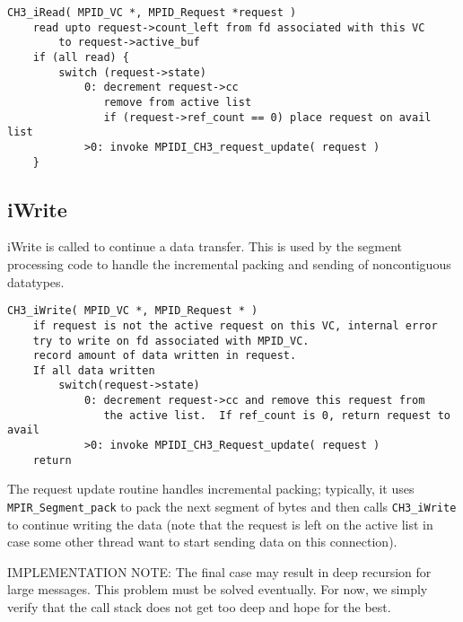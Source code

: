\documentclass{article}
\def\code{\begingroup\makeustext\eatcode}
\def\eatcode#1{\texttt{#1}\endgroup}
\begin{document}
\begin{verbatim}
CH3_iRead( MPID_VC *, MPID_Request *request )
    read upto request->count_left from fd associated with this VC
        to request->active_buf
    if (all read) {
        switch (request->state) 
            0: decrement request->cc
               remove from active list
               if (request->ref_count == 0) place request on avail list
            >0: invoke MPIDI_CH3_request_update( request )
    }
\end{verbatim}

\subsection{iWrite}
iWrite is called to continue a data transfer.  This is used by the
segment processing code to handle the incremental packing and sending
of noncontiguous datatypes.

\begin{verbatim}
CH3_iWrite( MPID_VC *, MPID_Request * )
    if request is not the active request on this VC, internal error
    try to write on fd associated with MPID_VC.  
    record amount of data written in request.
    If all data written
        switch(request->state)
            0: decrement request->cc and remove this request from
               the active list.  If ref_count is 0, return request to avail
            >0: invoke MPIDI_CH3_Request_update( request )
    return
\end{verbatim}
The request update routine handles incremental packing; typically, it
uses \code{MPIR_Segment_pack} to pack the next segment of bytes and
then calls \code{CH3_iWrite} to continue writing the data (note that
the request is left on the active list in case some other thread want
to start sending data on this connection).

IMPLEMENTATION NOTE: The final case may result in deep recursion for
large messages.  This problem must be solved eventually.  For now, we
simply verify that the call stack does not get too deep and hope for
the best.
\end{document}

